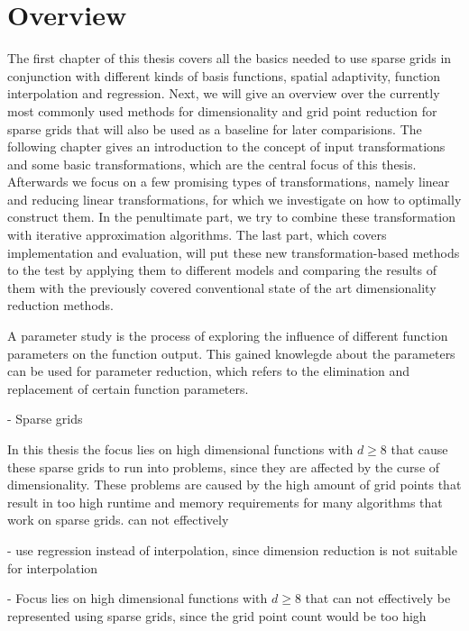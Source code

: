 \documentclass[
  a4paper,  %
  twoside,  %
  bibliography=totoc,
  headsepline,
  cleardoublepage=empty,
  parskip=half,
  draft=false
]{scrbook}
\begin{document}
\section{Overview}

The first chapter of this thesis covers all the basics needed to use sparse grids in conjunction with different kinds of basis functions, spatial adaptivity, function interpolation and regression.
Next, we will give an overview over the currently most commonly used methods for dimensionality and grid point reduction for sparse grids that will also be used as a baseline for later comparisions.
The following chapter gives an introduction to the concept of input transformations and some basic transformations, which are the central focus of this thesis.
Afterwards we focus on a few promising types of transformations, namely linear and reducing linear transformations, for which we investigate on how to optimally construct them.
In the penultimate part, we try to combine these transformation with iterative approximation algorithms.
The last part, which covers implementation and evaluation, will put these new transformation-based methods to the test by applying them to different models and comparing the results of them with the previously covered conventional state of the art dimensionality reduction methods.

A parameter study is the process of exploring the influence of different function parameters on the function output.
This gained knowlegde about the parameters can be used for parameter reduction, which refers to the elimination and replacement of certain function parameters.

- Sparse grids

In this thesis the focus lies on high dimensional functions with $d \geq 8$ that cause these sparse grids to run into problems, since they are affected by the curse of dimensionality.
These problems are caused by the high amount of grid points that result in too high runtime and memory requirements for many algorithms that work on sparse grids.
can not effectively

- use regression instead of interpolation, since dimension reduction is not suitable for interpolation

- Focus lies on high dimensional functions with $d \geq 8$ that can not effectively be represented using sparse grids, since the grid point count would be too high
\end{document}
